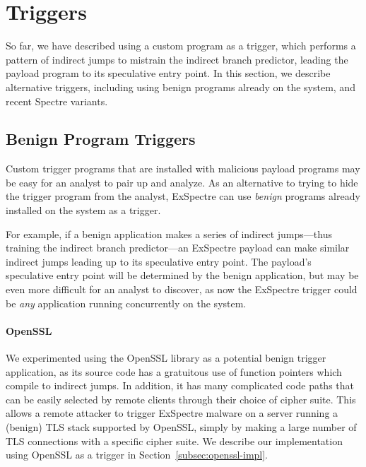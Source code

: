 

\section{Triggers}

So far, we have described using a custom program as a trigger, which performs a
pattern of indirect jumps to mistrain the indirect branch predictor, leading the
payload program to its speculative entry point. In this section, we describe
alternative triggers, including using benign programs already on the system, and
recent Spectre variants.

\subsection{Benign Program Triggers}
\label{subsec:openssl}

Custom trigger programs that are installed with malicious payload programs may
be easy for an analyst to pair up and analyze. As an alternative to trying to
hide the trigger program from the analyst, ExSpectre can use \emph{benign}
programs already installed on the system as a trigger.

For example, if a benign application makes a series of indirect jumps---thus
training the indirect branch predictor---an ExSpectre payload can make similar
indirect jumps leading up to its speculative entry point. The payload's
speculative entry point will be determined by the benign application, but may be
even more difficult for an analyst to discover, as now the ExSpectre trigger
could be \emph{any} application running concurrently on the system.

\paragraph{OpenSSL}
We experimented using the OpenSSL library as a potential benign trigger
application, as its source code has a gratuitous use of function pointers which
compile to indirect jumps. In addition, it has many complicated code paths that
can be easily selected by remote clients through their choice of cipher suite.
This allows a remote attacker to trigger ExSpectre malware on a server running a
(benign) TLS stack supported by OpenSSL, simply by making a large number of TLS
connections with a specific cipher suite. We describe our implementation using
OpenSSL as a trigger in Section~\ref{subsec:openssl-impl}.

